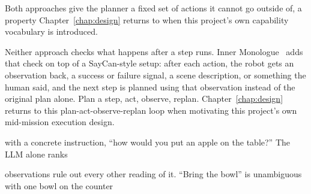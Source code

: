 Both approaches give the planner a fixed set of actions it cannot go outside of, a property
Chapter~\ref{chap:design} returns to when this project's own capability vocabulary is introduced.



Neither approach checks what happens after a step runs. Inner Monologue~\cite{huang2023innermonologue}
adds that check on top of a SayCan-style setup: after each action, the robot gets an observation
back, a success or failure signal, a scene description, or something the human said, and the next
step is planned using that observation instead of the original plan alone. Plan a step, act,
observe, replan. Chapter~\ref{chap:design} returns to this plan-act-observe-replan loop when
motivating this project's own mid-mission execution design.



with a concrete instruction, ``how would you put an apple on the table?'' The LLM alone ranks


observations rule out every other reading of it. ``Bring the bowl'' is unambiguous with one bowl on the counter



